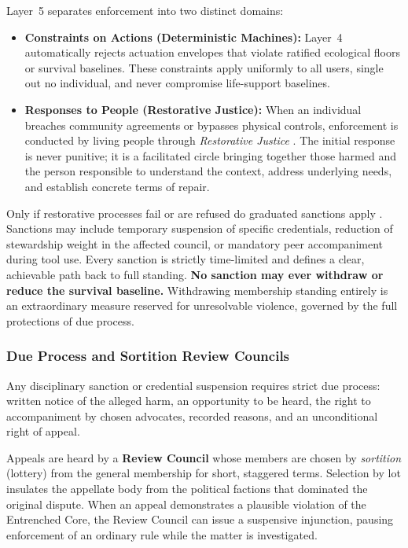 Layer~5 separates enforcement into two distinct domains:
\begin{itemize}
  \item \textbf{Constraints on Actions (Deterministic Machines):} Layer~4 automatically rejects actuation envelopes that violate ratified ecological floors or survival baselines. These constraints apply uniformly to all users, single out no individual, and never compromise life-support baselines.
  \item \textbf{Responses to People (Restorative Justice):} When an individual breaches community agreements or bypasses physical controls, enforcement is conducted by living people through \textit{Restorative Justice} \parencite{zehr1990}. The initial response is never punitive; it is a facilitated circle bringing together those harmed and the person responsible to understand the context, address underlying needs, and establish concrete terms of repair.
\end{itemize}

Only if restorative processes fail or are refused do graduated sanctions apply \parencite{ostrom1990}. Sanctions may include temporary suspension of specific credentials, reduction of stewardship weight in the affected council, or mandatory peer accompaniment during tool use. Every sanction is strictly time-limited and defines a clear, achievable path back to full standing. \textbf{No sanction may ever withdraw or reduce the survival baseline.} Withdrawing membership standing entirely is an extraordinary measure reserved for unresolvable violence, governed by the full protections of due process.

\subsubsection{Due Process and Sortition Review Councils}
\label{sec:l5-dueprocess}

Any disciplinary sanction or credential suspension requires strict due process: written notice of the alleged harm, an opportunity to be heard, the right to accompaniment by chosen advocates, recorded reasons, and an unconditional right of appeal.

Appeals are heard by a \textbf{Review Council} whose members are chosen by \textit{sortition} (lottery) from the general membership for short, staggered terms. Selection by lot insulates the appellate body from the political factions that dominated the original dispute. When an appeal demonstrates a plausible violation of the Entrenched Core, the Review Council can issue a suspensive injunction, pausing enforcement of an ordinary rule while the matter is investigated.

